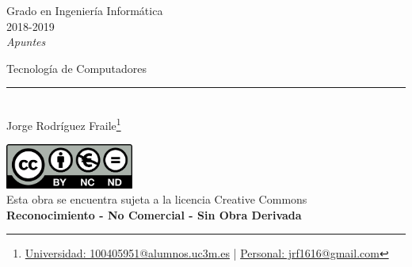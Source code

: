 \documentclass[12pt, twoside, openright]{report} %
\begin{document}
	
\begin{titlepage}
	\begin{sffamily}
	\color{azulUC3M}
	\begin{center}
		\begin{figure}[H] %
		\end{figure}
		\vspace{2.5cm}
		\begin{Large}
			Grado en Ingeniería Informática\\			
			2018-2019\\
			\vspace{2cm}		
			\textsl{Apuntes}\\
			\bigskip
		\end{Large}
		 	{\Huge Tecnología de Computadores}\\
		 	\vspace*{0.5cm}
	 		\rule{10.5cm}{0.1mm}\\
			\vspace*{0.9cm}
			{\LARGE Jorge Rodríguez Fraile\footnote{\href{mailto:100405951@alumnos.uc3m.es}{Universidad: 100405951@alumnos.uc3m.es}  |  \href{mailto:jrf1616@gmail.com}{Personal: jrf1616@gmail.com}}}\\ 
			\vspace*{1cm}
	\end{center}
	\vfill
	\color{black}
		\includegraphics[width=4.2cm]{img/creativecommons.png}\\
		Esta obra se encuentra sujeta a la licencia Creative Commons\\ \textbf{Reconocimiento - No Comercial - Sin Obra Derivada}
	\end{sffamily}
\end{titlepage}


\tableofcontents
\thispagestyle{fancy}
\end{document}
